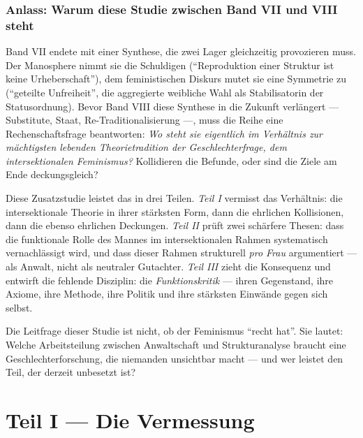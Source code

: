 
\section{Anlass: Warum diese Studie zwischen Band VII und VIII steht}

Band VII endete mit einer Synthese, die zwei Lager gleichzeitig provozieren
muss. Der Manosphere nimmt sie die Schuldigen (\enquote{Reproduktion einer
Struktur ist keine Urheberschaft}), dem feministischen Diskurs mutet sie eine
Symmetrie zu (\enquote{geteilte Unfreiheit}, die aggregierte weibliche Wahl als
Stabilisatorin der Statusordnung). Bevor Band VIII diese Synthese in die
Zukunft verlängert --- Substitute, Staat, Re-Traditionalisierung ---, muss die
Reihe eine Rechenschaftsfrage beantworten: \emph{Wo steht sie eigentlich im
Verhältnis zur mächtigsten lebenden Theorietradition der Geschlechterfrage,
dem intersektionalen Feminismus?} Kollidieren die Befunde, oder sind die Ziele
am Ende deckungsgleich?

Diese Zusatzstudie leistet das in drei Teilen. \emph{Teil I} vermisst das
Verhältnis: die intersektionale Theorie in ihrer stärksten Form, dann die
ehrlichen Kollisionen, dann die ebenso ehrlichen Deckungen. \emph{Teil II}
prüft zwei schärfere Thesen: dass die funktionale Rolle des Mannes im
intersektionalen Rahmen systematisch vernachlässigt wird, und dass dieser
Rahmen strukturell \emph{pro Frau} argumentiert --- als Anwalt, nicht als
neutraler Gutachter. \emph{Teil III} zieht die Konsequenz und entwirft die
fehlende Disziplin: die \emph{Funktionskritik} --- ihren Gegenstand, ihre
Axiome, ihre Methode, ihre Politik und ihre stärksten Einwände gegen sich
selbst.

\begin{merksatz}
Die Leitfrage dieser Studie ist nicht, ob der Feminismus \enquote{recht hat}.
Sie lautet: Welche Arbeitsteilung zwischen Anwaltschaft und Strukturanalyse
braucht eine Geschlechterforschung, die niemanden unsichtbar macht --- und wer
leistet den Teil, der derzeit unbesetzt ist?
\end{merksatz}

\part*{Teil I --- Die Vermessung}

